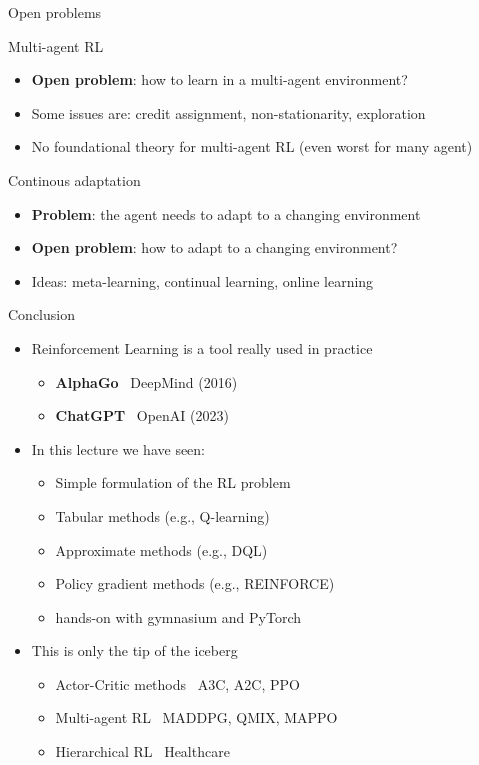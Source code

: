 \documentclass[presentation, 9pt]{beamer}\mode<presentation>{\usetheme{AMSBolognaFC}}
\begin{document}
\begin{frame}[allowframebreaks]{Open problems}
\begin{exampleblock}{Multi-agent RL}
\begin{itemize}
			\item \textbf{Open problem}: how to learn in a multi-agent environment?
			\item Some issues are: credit assignment, non-stationarity, exploration
			\item No foundational theory for multi-agent RL (even worst for many agent)
		\end{itemize}
	\end{exampleblock}
	\begin{exampleblock}{Continous adaptation}
		\begin{itemize}
			\item \textbf{Problem}: the agent needs to adapt to a changing environment
			\item \textbf{Open problem}: how to adapt to a changing environment?
			\item Ideas: meta-learning, continual learning, online learning
		\end{itemize}
	\end{exampleblock}
\end{frame} 
\begin{frame}{Conclusion}
	\begin{itemize}
		\item Reinforcement Learning is a tool really used in practice
		\begin{itemize}
			\item \textbf{AlphaGo} \faArrowRight \, DeepMind (2016)
			\item \textbf{ChatGPT} \faArrowRight \, OpenAI (2023)
		\end{itemize}
		\item In this lecture we have seen:
		\begin{itemize}
			\item Simple formulation of the RL problem
			\item Tabular methods (e.g., Q-learning)
			\item Approximate methods (e.g., DQL)
			\item Policy gradient methods (e.g., REINFORCE)
			\item hands-on with gymnasium and PyTorch
		\end{itemize}
		\item This is only the tip of the iceberg
		\begin{itemize}
			\item Actor-Critic methods \faArrowRight \, A3C, A2C, PPO
			\item Multi-agent RL \faArrowRight \, MADDPG, QMIX, MAPPO
			\item Hierarchical RL \faArrowRight \, Healthcare
		\end{itemize}
	\end{itemize}
\end{frame}
\end{document}
